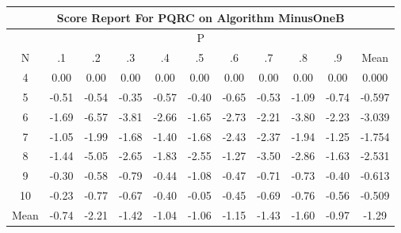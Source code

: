 \documentclass[11pt,a4paper]{report}
\begin{document}
\begin{longtable}{ | c || c | c | c | c | c | c | c | c | c || c |}
\hline
\multicolumn{11}{|c|}{ Score Report For PQRC on Algorithm MinusOneB} \\
\hline
\multicolumn{11}{|c|}{ P } \\
\hline
N & .1 & .2 & .3 & .4 & .5 & .6 & .7 & .8 & .9 & Mean\\
 \hline
 \hline
 \endhead
  4 &  \cellcolor[HTML]{FFFFFF} 0.00 &  \cellcolor[HTML]{FFFFFF} 0.00 &  \cellcolor[HTML]{FFFFFF} 0.00 &  \cellcolor[HTML]{FFFFFF} 0.00 &  \cellcolor[HTML]{FFFFFF} 0.00 &  \cellcolor[HTML]{FFFFFF} 0.00 &  \cellcolor[HTML]{FFFFFF} 0.00 &  \cellcolor[HTML]{FFFFFF} 0.00 &  \cellcolor[HTML]{FFFFFF} 0.00 & 0.000 \\
  5 &  \cellcolor[HTML]{FFEFEF} -0.51 &  \cellcolor[HTML]{FFEFEF} -0.54 &  \cellcolor[HTML]{FFF7F7} -0.35 &  \cellcolor[HTML]{FFEFEF} -0.57 &  \cellcolor[HTML]{FFF7F7} -0.40 &  \cellcolor[HTML]{FFEFEF} -0.65 &  \cellcolor[HTML]{FFEFEF} -0.53 &  \cellcolor[HTML]{FFE7E7} -1.09 &  \cellcolor[HTML]{FFEFEF} -0.74 & -0.597 \\
  6 &  \cellcolor[HTML]{FFD7D7} -1.69 &  \cellcolor[HTML]{FF5858} -6.57 &  \cellcolor[HTML]{FF9F9F} -3.81 &  \cellcolor[HTML]{FFBFBF} -2.66 &  \cellcolor[HTML]{FFD7D7} -1.65 &  \cellcolor[HTML]{FFB7B7} -2.73 &  \cellcolor[HTML]{FFC7C7} -2.21 &  \cellcolor[HTML]{FF9F9F} -3.80 &  \cellcolor[HTML]{FFC7C7} -2.23 & -3.039 \\
  7 &  \cellcolor[HTML]{FFE7E7} -1.05 &  \cellcolor[HTML]{FFCFCF} -1.99 &  \cellcolor[HTML]{FFD7D7} -1.68 &  \cellcolor[HTML]{FFDFDF} -1.40 &  \cellcolor[HTML]{FFD7D7} -1.68 &  \cellcolor[HTML]{FFBFBF} -2.43 &  \cellcolor[HTML]{FFC7C7} -2.37 &  \cellcolor[HTML]{FFCFCF} -1.94 &  \cellcolor[HTML]{FFDFDF} -1.25 & -1.754 \\
  8 &  \cellcolor[HTML]{FFD7D7} -1.44 &  \cellcolor[HTML]{FF8080} -5.05 &  \cellcolor[HTML]{FFBFBF} -2.65 &  \cellcolor[HTML]{FFCFCF} -1.83 &  \cellcolor[HTML]{FFBFBF} -2.55 &  \cellcolor[HTML]{FFDFDF} -1.27 &  \cellcolor[HTML]{FFA7A7} -3.50 &  \cellcolor[HTML]{FFB7B7} -2.86 &  \cellcolor[HTML]{FFD7D7} -1.63 & -2.531 \\
  9 &  \cellcolor[HTML]{FFF7F7} -0.30 &  \cellcolor[HTML]{FFEFEF} -0.58 &  \cellcolor[HTML]{FFEFEF} -0.79 &  \cellcolor[HTML]{FFF7F7} -0.44 &  \cellcolor[HTML]{FFE7E7} -1.08 &  \cellcolor[HTML]{FFF7F7} -0.47 &  \cellcolor[HTML]{FFEFEF} -0.71 &  \cellcolor[HTML]{FFEFEF} -0.73 &  \cellcolor[HTML]{FFF7F7} -0.40 & -0.613 \\
  10 &  \cellcolor[HTML]{FFF7F7} -0.23 &  \cellcolor[HTML]{FFEFEF} -0.77 &  \cellcolor[HTML]{FFEFEF} -0.67 &  \cellcolor[HTML]{FFF7F7} -0.40 &  \cellcolor[HTML]{FFFFFF} -0.05 &  \cellcolor[HTML]{FFF7F7} -0.45 &  \cellcolor[HTML]{FFEFEF} -0.69 &  \cellcolor[HTML]{FFEFEF} -0.76 &  \cellcolor[HTML]{FFEFEF} -0.56 & -0.509 \\
 \hline
 \hline
Mean &  \cellcolor[HTML]{FFEFEF} -0.74 &  \cellcolor[HTML]{FFC7C7} -2.21 &  \cellcolor[HTML]{FFDFDF} -1.42 &  \cellcolor[HTML]{FFE7E7} -1.04 &  \cellcolor[HTML]{FFE7E7} -1.06 &  \cellcolor[HTML]{FFDFDF} -1.15 &  \cellcolor[HTML]{FFD7D7} -1.43 &  \cellcolor[HTML]{FFD7D7} -1.60 &  \cellcolor[HTML]{FFE7E7} -0.97 &  \cellcolor[HTML]{FFDFDF} -1.29
\end{longtable}
\end{document}
